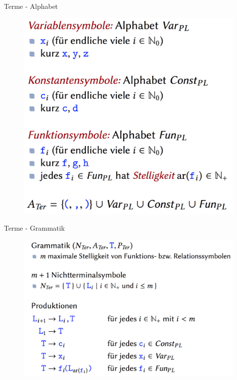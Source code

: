 \begin{frame}{Terme - Alphabet}
\begin{figure}
	\centering
	\includegraphics[scale=0.2]{TermeAlphabet.png} \hspace{2em} 
\end{figure} 
\end{frame}

\begin{frame}{Terme - Grammatik}
\begin{figure}[h!]
	\centering
	\includegraphics[scale=0.2]{TermeGrammatik.png} \hspace{2em} 
\end{figure} 
\end{frame}

